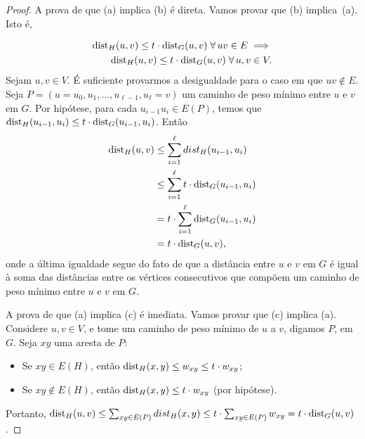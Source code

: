 \begin{proof}
  A prova de que \rm (a) implica \rm (b) 
  é direta. Vamos provar que \rm (b) implica~\rm (a). Isto é, 

\begin{equation*}
\begin{split}
{\mathrm{dist}}_{H}(u,v) \le t \cdot  {\mathrm{dist}}_{G}(u,v)\; \forall\,uv \in E\implies \\
{\mathrm{dist}}_{H}(u,v) \le t \cdot {\mathrm{dist}}_{G}(u,v) \; \forall\,u,v \in V.
\end{split}
\end{equation*}
Sejam $u,v \in V$. É suficiente provarmos a desigualdade para o caso em que $uv \notin E$. Seja 
$P = (u = u_0, u_1, \ldots, u_{\ell-1}, u_{\ell} = v)$ um caminho de peso mínimo entre 
$u$ e $v$ em $G$. Por hipótese, para cada 
$u_{i-1}u_i \in E(P)$, temos que ${\mathrm{dist}}_{H}(u_{i-1},u_i) \le t \cdot {\mathrm{dist}}_{G}(u_{i-1},u_i)$.
 Então
\begin{align*}
{\mathrm{dist}}_{H}(u,v) &\le \sum_{i = 1}^{\ell} dist_{H}(u_{i-1},u_i)\\ 
&\le \sum_{i = 1}^{\ell} t \cdot  {\mathrm{dist}}_{G}(u_{i-1},u_i)\\
&= t \cdot \sum_{i = 1}^{\ell} {\mathrm{dist}}_{G}(u_{i-1},u_i)\\
&= t \cdot {\mathrm{dist}}_{G}(u,v),
\end{align*}
onde a última igualdade segue do fato de que a distância entre $u$
e $v$ em $G$ é igual à soma das distâncias entre os vértices
consecutivos que compõem um caminho de peso mínimo entre $u$ e $v$ em $G$. 

A prova de que (\rm a) implica (\rm c) é imediata. Vamos provar que (\rm c) implica (\rm a). Considere $u,v \in V$, e tome um caminho de peso mínimo de $u$ a $v$, digamos $P$, em $G$. Seja $xy$ uma aresta de $P$: \begin{itemize}
  \item Se $xy \in E(H)$, então ${\mathrm{dist}}_{H}(x,y) \le w_{xy} \le t \cdot w_{xy}$;
  \item Se $xy \not\in E(H)$, então ${\mathrm{dist}}_{H}(x,y) \le t \cdot w_{xy}$ (por hipótese).
\end{itemize}
Portanto, ${\mathrm{dist}}_{H}(u,v) \le \sum_{xy \in E(P)} dist_{H}(x,y) \le t \cdot \sum_{xy \in E(P)} w_{xy} = t \cdot {\mathrm{dist}}_{G}(u,v)$.
\end{proof}


